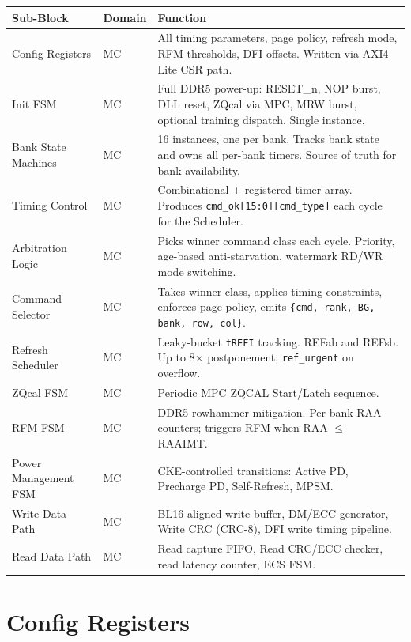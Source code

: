 \documentclass[10pt,a4paper]{article}
\newcommand{\Th}[1]{\cellcolor{cellbg}\textbf{\small #1}}
\newcommand{\RA}{\rowcolor{white}}
\newcommand{\RB}{\rowcolor{altbg}}
\begin{document}
\begin{center}
\begin{tabularx}{\linewidth}{@{} l l X @{}}
\toprule
\Th{Sub-Block} & \Th{Domain} & \Th{Function} \\
\midrule
\RA Config Registers & MC & All timing parameters, page policy, refresh mode, RFM
  thresholds, DFI offsets. Written via AXI4-Lite CSR path. \\
\RB Init FSM & MC & Full DDR5 power-up: RESET\_n, NOP burst, DLL reset, ZQcal
  via MPC, MRW burst, optional training dispatch. Single instance. \\
\RA Bank State Machines & MC & 16 instances, one per bank. Tracks bank state and
  owns all per-bank timers. Source of truth for bank availability. \\
\RB Timing Control & MC & Combinational + registered timer array. Produces
  \texttt{cmd\_ok[15:0][cmd\_type]} each cycle for the Scheduler. \\
\RA Arbitration Logic & MC & Picks winner command class each cycle. Priority,
  age-based anti-starvation, watermark RD/WR mode switching. \\
\RB Command Selector & MC & Takes winner class, applies timing constraints, enforces
  page policy, emits \texttt{\{cmd, rank, BG, bank, row, col\}}. \\
\RA Refresh Scheduler & MC & Leaky-bucket \texttt{tREFI} tracking. REFab and REFsb.
  Up to 8$\times$ postponement; \texttt{ref\_urgent} on overflow. \\
\RB ZQcal FSM & MC & Periodic MPC ZQCAL Start/Latch sequence. \\
\RA RFM FSM & MC & DDR5 rowhammer mitigation. Per-bank RAA counters; triggers
  RFM when RAA $\leq$ RAAIMT. \\
\RB Power Management FSM & MC & CKE-controlled transitions: Active PD, Precharge PD,
  Self-Refresh, MPSM. \\
\RA Write Data Path & MC & BL16-aligned write buffer, DM/ECC generator, Write CRC
  (CRC-8), DFI write timing pipeline. \\
\RB Read Data Path & MC & Read capture FIFO, Read CRC/ECC checker, read latency
  counter, ECS FSM. \\
\bottomrule
\end{tabularx}
\end{center}

\section{Config Registers}
\end{document}
